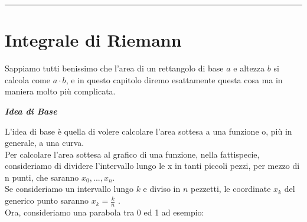 \documentclass{article}
\theoremstyle{definition}
\begin{document}
    \vspace{15pt}
    \hrule
    \vspace{15pt}

\newpage
\section{Integrale di Riemann}
Sappiamo tutti benissimo che l'area di un rettangolo di base $a$ e altezza $b$ si calcola come $a \cdot b$, e in questo capitolo diremo esattamente questa cosa ma in maniera molto più complicata.
\\
\begin{center}
    \textbf{\textit{Idea di Base}}
\end{center}
L'idea di base è quella di volere calcolare l'area sottesa a una funzione o, più in generale, a una curva.
\\
Per calcolare l'area sottesa al grafico di una funzione, nella fattispecie, consideriamo di dividere l'intervallo lungo le x in tanti piccoli pezzi, per mezzo di n punti, che saranno $x_0,...,x_n$.
\\
Se consideriamo un intervallo lungo $k$ e diviso in $n$ pezzetti, le coordinate $x_k$ del generico punto saranno $x_k=\frac{k}{n}$
.
\\
Ora, consideriamo una parabola tra 0 ed 1 ad esempio:
\begin{center}
\end{center}
\end{document}
